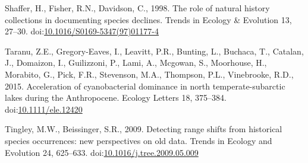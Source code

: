 \hypertarget{ref-Shaffer1998}{}
Shaffer, H., Fisher, R.N., Davidson, C., 1998. The role of natural
history collections in documenting species declines. Trends in Ecology
\& Evolution 13, 27--30.
doi:\href{https://doi.org/10.1016/S0169-5347(97)01177-4}{10.1016/S0169-5347(97)01177-4}

\hypertarget{ref-Taranu2015}{}
Taranu, Z.E., Gregory-Eaves, I., Leavitt, P.R., Bunting, L., Buchaca,
T., Catalan, J., Domaizon, I., Guilizzoni, P., Lami, A., Mcgowan, S.,
Moorhouse, H., Morabito, G., Pick, F.R., Stevenson, M.A., Thompson,
P.L., Vinebrooke, R.D., 2015. Acceleration of cyanobacterial dominance
in north temperate-subarctic lakes during the Anthropocene. Ecology
Letters 18, 375--384.
doi:\href{https://doi.org/10.1111/ele.12420}{10.1111/ele.12420}

\hypertarget{ref-Tingley2009b}{}
Tingley, M.W., Beissinger, S.R., 2009. Detecting range shifts from
historical species occurrences: new perspectives on old data. Trends in
Ecology and Evolution 24, 625--633.
doi:\href{https://doi.org/10.1016/j.tree.2009.05.009}{10.1016/j.tree.2009.05.009}
